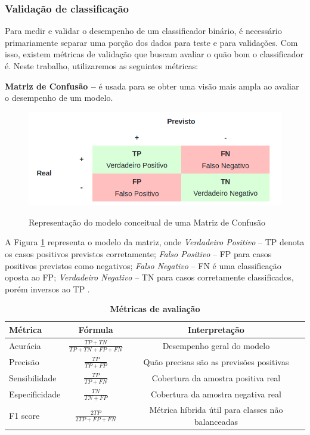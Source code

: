 \subsubsection*{Validação de classificação}
Para medir e validar o desempenho de um classificador binário, é necessário primariamente separar uma porção dos dados para teste e para validações. Com isso, existem métricas de validação que buscam avaliar o quão bom o classificador é. Neste trabalho, utilizaremos as seguintes métricas:

\textbf{Matriz de Confusão --} é usada para se obter uma visão mais ampla ao avaliar o desempenho de um modelo.

\begin{figure}[ht]
\caption{Representação do modelo conceitual de uma Matriz de Confusão \cite{amidi2020ml}}
\centering %
\includegraphics[width=12cm]{figuras/matriz_confusao.png}
\label{figura_matriz_confusao}
\end{figure}

A Figura \ref{figura_matriz_confusao} representa o modelo da matriz, onde \textit{Verdadeiro Positivo} -- TP denota os casos positivos previstos corretamente; \textit{Falso Positivo} -- FP para casos positivos previstos como negativos; \textit{Falso Negativo} -- FN é uma classificação oposta ao FP; \textit{Verdadeiro Negativo} -- TN para casos corretamente classificados, porém inversos ao TP \cite{amidi2020ml} .

\begin{table}[htb]
\centering 
    \caption{\textbf{Métricas de avaliação}}
    \label{tab:metricas}
    \vspace{2mm}
    \begin{tabular}{| l| c | c | }
    \hline
    \textbf{Métrica} &\textbf{Fórmula} &\textbf{Interpretação}\\ \hline
    Acurácia & $\frac{TP + TN}{TP + TN + FP + FN}$ &Desempenho geral do modelo \\ \hline
    Precisão & $\frac{TP} {TP + FP}$ & Quão precisas são as previsões positivas \\ \hline
    Sensibilidade & $\frac{TP} {TP + FN}$ & Cobertura da amostra positiva real \\ \hline
    Especificidade & $\frac{TN} {TN + FP}$ & Cobertura da amostra negativa real \\ \hline
    F1 score & $\frac{2 TP} {2 TP + FP + FN}$ & Métrica híbrida útil para classes não balanceadas \\ \hline
    \end{tabular}

\end{table}

